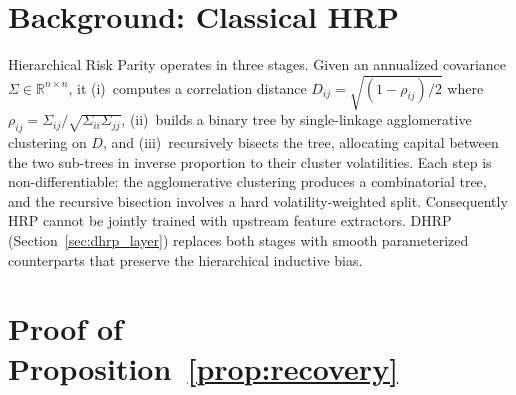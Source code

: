 
\section{Background: Classical HRP}
\label{app:hrp_recap}

Hierarchical Risk Parity \citep{LopezdePrado2016} operates in three
stages. Given an annualized covariance $\Sigma \in \mathbb{R}^{n \times n}$,
it (i)~computes a correlation distance
$D_{ij} = \sqrt{(1 - \rho_{ij})/2}$ where
$\rho_{ij} = \Sigma_{ij}/\sqrt{\Sigma_{ii}\Sigma_{jj}}$,
(ii)~builds a binary tree by single-linkage agglomerative clustering on
$D$, and (iii)~recursively bisects the tree, allocating capital between
the two sub-trees in inverse proportion to their cluster volatilities.
Each step is non-differentiable: the agglomerative clustering produces
a combinatorial tree, and the recursive bisection involves a hard
volatility-weighted split. Consequently HRP cannot be jointly trained
with upstream feature extractors. DHRP
(Section~\ref{sec:dhrp_layer}) replaces both stages with smooth
parameterized counterparts that preserve the hierarchical inductive bias.

\section{Proof of Proposition~\ref{prop:recovery}}
\label{app:proof}

